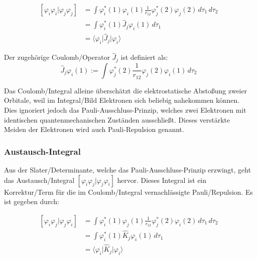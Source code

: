 \begin{equation}\label{coulomb}
\begin{aligned}
  \left[ \varphi_i \varphi_i \vert \varphi_j \varphi_j \right] &= 
  \int \varphi_i^*(1) \varphi_i(1) \frac{1}{r_{12}} \varphi_j^*(2) \varphi_j(2) \,d\tau_1 \,d\tau_2\\
  &= \int \varphi_i^*(1) \hat{J}_j \varphi_i(1) \,d\tau_1 \\ 
  &= \langle \varphi_i \vert \hat{J}_j \vert \varphi_i \rangle
\end{aligned}
\end{equation}

Der zugehörige Coulomb\-/Operator $\hat{J}_j$ ist definiert als:
\begin{equation}\label{coulomb-operator}
  \hat{J}_j \varphi_i(1):= 
  \int \varphi_j^*(2) \frac{1}{r_{12}} \varphi_j(2) \varphi_i(1) \,d\tau_2 
\end{equation}

Das Coulomb\-/Integral alleine überschätzt die elektrostatische Abstoßung zweier Orbitale,
weil im Integral\-/Bild Elektronen sich beliebig nahekommen können.
Dies ignoriert jedoch das Pauli-Ausschluss-Prinzip, 
welches zwei Elektronen mit identischen quantenmechanischen Zuständen ausschließt.
Dieses verstärkte Meiden der Elektronen wird auch Pauli-Repulsion genannt.

\cite[S. 206]{lewars_2016} \cite[S. 23]{tc2_3}

\subsubsection*{Austausch-Integral}
Aus der Slater\-/Determinante, welche das Pauli-Ausschluss-Prinzip erzwingt,
geht das Austausch\-/Integral $\left[ \varphi_i \varphi_j \vert \varphi_j\varphi_i \right]$ hervor.
Dieses Integral ist ein Korrektur\-/Term für die im Coulomb\-/Integral vernachlässigte Pauli\-/Repulsion.
Es ist gegeben durch:


\begin{equation}\label{exchange}
  \begin{aligned}
  \left[ \varphi_i \varphi_j \vert \varphi_j \varphi_i \right] &= 
  \int \varphi_i^*(1) \varphi_j(1) \frac{1}{r_{12}} \varphi_j^*(2) \varphi_i(2) \,d\tau_1 \,d\tau_2\\
  &= \int \varphi_i^*(1) \hat{K}_j \varphi_i(1) \,d\tau_1 \\ 
  &= \langle \varphi_i \vert \hat{K}_j \vert \varphi_i \rangle
\end{aligned}
\end{equation}

